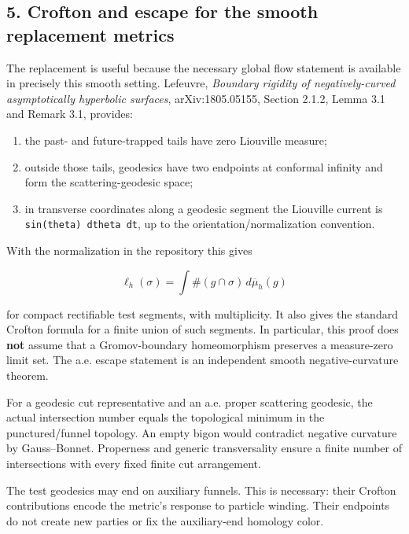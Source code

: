 \documentclass[11pt]{article}
\providecommand{\tightlist}{\setlength{\itemsep}{1pt}\setlength{\parskip}{0pt}}
\begin{document}
\subsection{5. Crofton and escape for the smooth replacement
metrics}\label{crofton-and-escape-for-the-smooth-replacement-metrics}

The replacement is useful because the necessary global flow statement is
available in precisely this smooth setting. Lefeuvre, \emph{Boundary
rigidity of negatively-curved asymptotically hyperbolic surfaces},
arXiv:1805.05155, Section 2.1.2, Lemma 3.1 and Remark 3.1, provides:

\begin{enumerate}
\def\labelenumi{\arabic{enumi}.}
\tightlist
\item
  the past- and future-trapped tails have zero Liouville measure;
\item
  outside those tails, geodesics have two endpoints at conformal
  infinity and form the scattering-geodesic space;
\item
  in transverse coordinates along a geodesic segment the Liouville
  current is \texttt{sin(theta)\ dtheta\ dt}, up to the
  orientation/normalization convention.
\end{enumerate}

With the normalization in the repository this gives

\[
\ell_h(\sigma)=\int \#(g\cap\sigma)\,d\overline\mu_h(g)
\tag{8}
\]

for compact rectifiable test segments, with multiplicity. It also gives
the standard Crofton formula for a finite union of such segments. In
particular, this proof does \textbf{not} assume that a Gromov-boundary
homeomorphism preserves a measure-zero limit set. The a.e. escape
statement is an independent smooth negative-curvature theorem.

For a geodesic cut representative and an a.e. proper scattering
geodesic, the actual intersection number equals the topological minimum
in the punctured/funnel topology. An empty bigon would contradict
negative curvature by Gauss--Bonnet. Properness and generic
transversality ensure a finite number of intersections with every fixed
finite cut arrangement.

The test geodesics may end on auxiliary funnels. This is necessary:
their Crofton contributions encode the metric's response to particle
winding. Their endpoints do not create new parties or fix the
auxiliary-end homology color.
\end{document}
